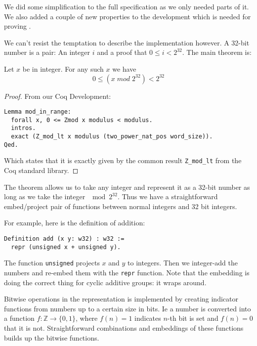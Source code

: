 We did some simplification to the full specification as we only needed
parts of it. We also added a couple of new properties to the
development which is needed for proving \januso{}.

We can't resist the temptation to describe the implementation however. A
32-bit number is a pair: An integer $i$ and a proof that $0 \leq i <
2^{32}$. The main theorem is:
\begin{lem}
  Let $x$ be in integer. For any such $x$ we have
  \begin{equation*}
    0 \leq (x \;mod\; 2^{32}) < 2^{32}
  \end{equation*}
\end{lem}
\begin{proof}
  From our Coq Development:
\begin{verbatim}
Lemma mod_in_range:
  forall x, 0 <= Zmod x modulus < modulus.
  intros.
  exact (Z_mod_lt x modulus (two_power_nat_pos word_size)).
Qed.
\end{verbatim}
  Which states that it is exactly given by the common result
  \texttt{Z\_mod\_lt} from the Coq standard library.
\end{proof}
The theorem allows us to take any integer and represent it as a 32-bit
number as long as we take the integer $\mod 2^{32}$. Thus we have a
straightforward embed/project pair of functions between normal
integers and 32 bit integers.

For example, here is the definition of addition:
\begin{verbatim}
Definition add (x y: w32) : w32 :=
  repr (unsigned x + unsigned y).
\end{verbatim}
The function \texttt{unsigned} projects $x$ and $y$ to integers. Then
we integer-add the numbers and re-embed them with the \texttt{repr}
function. Note that the embedding is doing the correct thing for
cyclic additive groups: it wraps around.

Bitwise operations in the representation is implemented by creating
indicator functions from numbers up to a certain size in bits. Ie a
number is converted into a function $f \colon \mathbb{Z} \to \{0,
1\}$, where $f(n) = 1$ indicates $n$-th bit is set and $f(n) = 0$
that it is not. Straightforward combinations and embeddings of these
functions builds up the bitwise functions.

